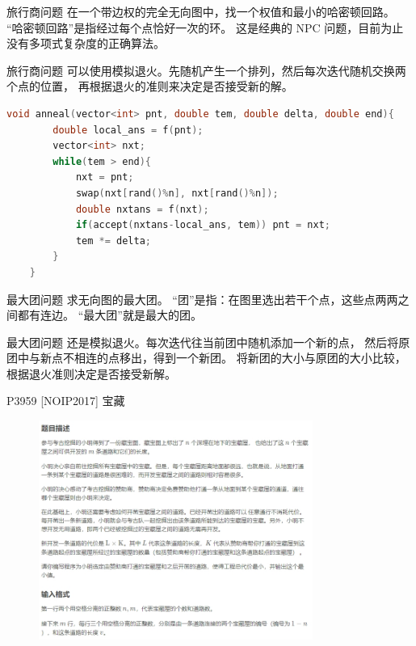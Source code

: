 \documentclass{beamer}
\begin{document}
\begin{frame}{旅行商问题}
    \small
    在一个带边权的完全无向图中，找一个权值和最小的哈密顿回路。
    \vspace{1em}
    “哈密顿回路”是指经过每个点恰好一次的环。
    \vspace{1em}
    这是经典的 NPC 问题，目前为止没有多项式复杂度的正确算法。
\end{frame}

\begin{frame}[fragile]{旅行商问题}
    \small
    可以使用模拟退火。先随机产生一个排列，然后每次迭代随机交换两个点的位置，
    再根据退火的准则来决定是否接受新的解。

    \vspace{1em}
    \begin{lstlisting}[language=c++]
    void anneal(vector<int> pnt, double tem, double delta, double end){
        double local_ans = f(pnt);
        vector<int> nxt;
        while(tem > end){
            nxt = pnt;
            swap(nxt[rand()%n], nxt[rand()%n]);
            double nxtans = f(nxt);
            if(accept(nxtans-local_ans, tem)) pnt = nxt;
            tem *= delta;
        }
    }
    \end{lstlisting}

\end{frame}

\begin{frame}{最大团问题}
    \small
    求无向图的最大团。
    \vspace{1em}
    “团”是指：在图里选出若干个点，这些点两两之间都有连边。
    “最大团”就是最大的团。
\end{frame}

\begin{frame}{最大团问题}
    \small
    还是模拟退火。每次迭代往当前团中随机添加一个新的点，
    然后将原团中与新点不相连的点移出，得到一个新团。
    将新团的大小与原团的大小比较，根据退火准则决定是否接受新解。
\end{frame}

\begin{frame}{P3959 [NOIP2017] 宝藏}
    \small
    \begin{figure}[H]
        \centering
        \includegraphics[width=0.8\textwidth]{pic/p3959.png}
    \end{figure}
\end{frame}
\end{document}
